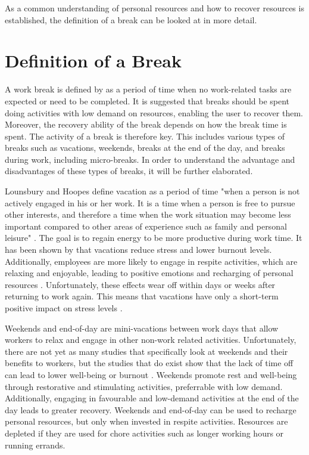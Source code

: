 \documentclass{hasel_thesis}
\begin{document}
As a common understanding of personal resources and how to recover resources is established, the definition of a break can be looked at in more detail.


\section{Definition of a Break}

A work break is defined by \cite{Trougakos.2009} as a period of time when no work-related tasks are expected or need to be completed. It is suggested that breaks should be spent doing activities with low demand on resources, enabling the user to recover them. Moreover, the recovery ability of the break depends on how the break time is spent. The activity of a break is therefore key. This includes various types of breaks such as vacations, weekends, breaks at the end of the day, and breaks during work, including micro-breaks. In order to understand the advantage and disadvantages of these types of breaks, it will be further elaborated.


Lounsbury and Hoopes \cite{Lounsbury.1986} define vacation as a period of time "when a person is not actively engaged in his or her work. It is a time when a person is free to pursue other interests, and therefore a time when the work situation may become less important compared to other areas of experience such as family and personal leisure" \cite[p. 393]{Lounsbury.1986}. The goal is to regain energy to be more productive during work time. It has been shown by \cite{Westman.1997, Westman.2001} that vacations reduce stress and lower burnout levels. Additionally, employees are more likely to engage in respite activities, which are relaxing and enjoyable, leading to positive emotions and recharging of personal resources \cite{Fritz.2006}. Unfortunately, these effects wear off within days or weeks after returning to work again. This means that vacations have only a short-term positive impact on stress levels \cite{Fritz.2006}.


Weekends and end-of-day are mini-vacations between work days that allow workers to relax and engage in other non-work related activities. Unfortunately, there are not yet as many studies that specifically look at weekends and their benefits to workers, but the studies that do exist show that the lack of time off can lead to lower well-being or burnout \cite{Fritz.2005}. Weekends promote rest and well-being through restorative and stimulating activities, preferrable with low demand. Additionally, engaging in favourable and low-demand activities at the end of the day leads to greater recovery. Weekends and end-of-day can be used to recharge personal resources, but only when invested in respite activities. Resources are depleted if they are used for chore activities such as longer working hours or running errands.
\end{document}
